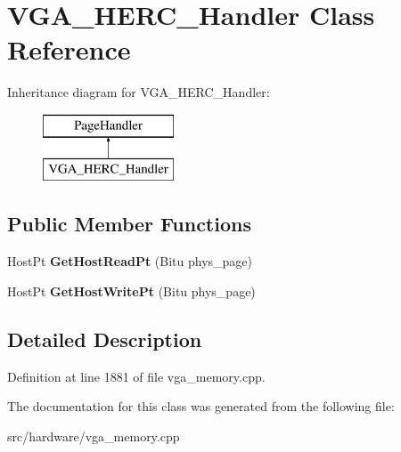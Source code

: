 \hypertarget{classVGA__HERC__Handler}{\section{V\-G\-A\-\_\-\-H\-E\-R\-C\-\_\-\-Handler Class Reference}
\label{classVGA__HERC__Handler}
}
Inheritance diagram for V\-G\-A\-\_\-\-H\-E\-R\-C\-\_\-\-Handler\-:\begin{figure}[H]
\begin{center}
\leavevmode
\includegraphics[height=2.000000cm]{classVGA__HERC__Handler}
\end{center}
\end{figure}
\subsection*{Public Member Functions}
\begin{DoxyCompactItemize}
\item 
\hypertarget{classVGA__HERC__Handler_ae520d92ecc21ac737cfc8039316e6e5c}{Host\-Pt {\bfseries Get\-Host\-Read\-Pt} (Bitu phys\-\_\-page)}\label{classVGA__HERC__Handler_ae520d92ecc21ac737cfc8039316e6e5c}

\item 
\hypertarget{classVGA__HERC__Handler_a25f8f05f6c70a3170445cf0ae346718e}{Host\-Pt {\bfseries Get\-Host\-Write\-Pt} (Bitu phys\-\_\-page)}\label{classVGA__HERC__Handler_a25f8f05f6c70a3170445cf0ae346718e}

\end{DoxyCompactItemize}


\subsection{Detailed Description}


Definition at line 1881 of file vga\-\_\-memory.\-cpp.



The documentation for this class was generated from the following file\-:\begin{DoxyCompactItemize}
\item 
src/hardware/vga\-\_\-memory.\-cpp\end{DoxyCompactItemize}
